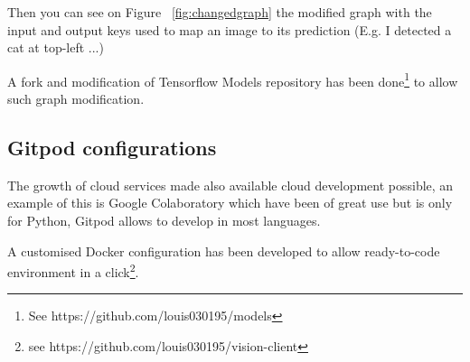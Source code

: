 Then you can see on Figure ~\ref{fig:changedgraph} the modified graph with the input and output keys used to map an image to its prediction (E.g. I detected a cat at top-left ...)

A fork and modification of Tensorflow Models repository has been done\footnote{See https://github.com/louis030195/models} to allow such graph modification.

\subsection{Gitpod configurations}

The growth of cloud services made also available cloud development possible, an example of this is Google Colaboratory\cite{colab} which have been of great use but is only for Python, Gitpod\cite{gitpod} allows to develop in most languages.

A customised Docker configuration has been developed to allow ready-to-code environment in a click\footnote{see https://github.com/louis030195/vision-client}.
